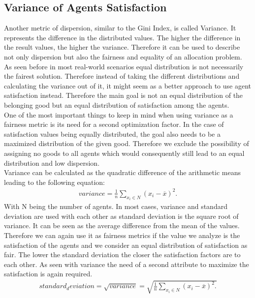 \documentclass[german, a4paper, 11pt, oneside]{scrbook}
\begin{document}
\subsection{Variance of Agents Satisfaction}
Another metric of dispersion, similar to the Gini Index, is called Variance. It represents the difference in the distributed values.  The higher the difference in the result values, the higher the variance. Therefore it can be used to describe not only dispersion but also the fairness and equality of an allocation problem. As seen before in most real-world scenarios equal distribution is not necessarily the fairest solution. Therefore instead of taking the different distributions and calculating the variance out of it, it might seem as a better approach to use agent satisfaction instead. Therefore the main goal is not an equal distribution of the belonging good but an equal distribution of satisfaction among the agents. \\One of the most important things to keep in mind when using variance as a fairness metric is its need for a second optimization factor. In the case of satisfaction values being equally distributed, the goal also needs to be a maximized distribution of the given good. Therefore we exclude the possibility of assigning no goods to all agents which would consequently still lead to an equal distribution and low dispersion. \cite{.2022} \\Variance can be calculated as the quadratic difference of the arithmetic means leading to the following equation:
\begin{align}
variance=\frac{1}{n}\sum\limits_{x_i\in N} (x_i-\overline{x})^2.
\end{align}\cite{.2022}
With N being the number of agents. In most cases, variance and standard deviation are used with each other as standard deviation is the square root of variance. It can be seen as the average difference from the mean of the values. Therefore we can again use it as fairness metrics if the value we analyze is the satisfaction of the agents and we consider an equal distribution of satisfaction as fair. The lower the standard deviation the closer the satisfaction factors are to each other. As seen with variance the need of a second attribute to maximize the satisfaction is again required.
\begin{align}
standard_deviation=\sqrt{variance}=\sqrt{\frac{1}{n}\sum\limits_{x_i\in N} (x_i-\overline{x})^2.}
\end{align}
\cite{.2022}
\end{document}
